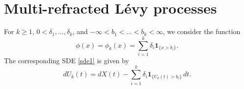 \documentclass[12pt,reqno]{amsart}
\newcommand{\red}{\textcolor[rgb]{1.00,0.00,0.00}}
\theoremstyle{definition}
\theoremstyle{remark}
\newcommand{\ind}{\mathbf{1}}
\begin{document}
%
%



\section{Multi-refracted L\'evy processes}\label{sec:mult.refr}


For $k \geq 1$, $0<\delta_1,\dots,\delta_k$, and $-\infty<b_1<...<b_k<\infty$, we consider the function
$$\phi(x)=\phi_k(x)=\sum_{i=1}^k\delta_i\ind_{\{x > b_i\}}.$$
The corresponding SDE \eqref{sde1} is given by
\begin{equation}\label{procU_n}
					dU_{k}(t)=dX(t)-\sum_{i=1}^{k}\delta_i \ind_{\{U_{k}(t)>b_i\}}\,dt.
		\end{equation}
		
\end{document}

